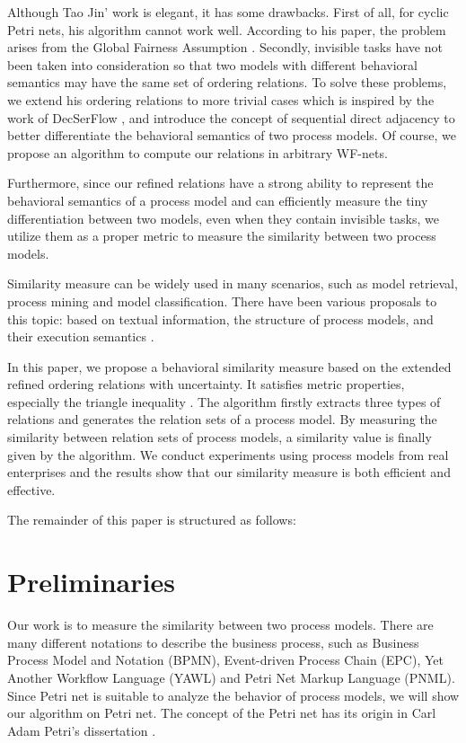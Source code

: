 \documentclass{llncs}
\begin{document}
Although Tao Jin' work is elegant, it has some drawbacks. First of all, for cyclic Petri nets, his algorithm cannot work well. According to his paper, the problem arises from the Global Fairness Assumption \cite{kindler1999liveness}. Secondly, invisible tasks have not been taken into consideration so that two models with different behavioral semantics may have the same set of ordering relations. To solve these problems, we extend his ordering relations to more trivial cases which is inspired by the work of DecSerFlow \cite{van2006decserflow}, and introduce the concept of sequential direct adjacency to better differentiate the behavioral semantics of two process models. Of course, we propose an algorithm to compute our relations in arbitrary WF-nets.

Furthermore, since our refined relations have a strong ability to represent the behavioral semantics of a process model and can efficiently measure the tiny differentiation between two models, even when they contain invisible tasks, we utilize them as a proper metric to measure the similarity between two process models.

Similarity measure can be widely used in many scenarios, such as model retrieval, process mining and model classification. There have been various proposals to this topic: based on textual information, the structure of process models, and their execution semantics \cite{kunze2011behavioral}.

In this paper, we propose a behavioral similarity measure based on the extended refined ordering relations with uncertainty. It satisfies metric properties, especially the triangle inequality \cite{zezula2006similarity}. The algorithm firstly extracts three types of relations and generates the relation sets of a process model. By measuring the similarity between relation sets of process models, a similarity value is finally given by the algorithm. We conduct experiments using process models from real enterprises and the results show that our similarity measure is both efficient and effective.

The remainder of this paper is structured as follows: 

\section{Preliminaries}\label{sec:preliminaries}
Our work is to measure the similarity between two process models. There are many different notations to describe the business process, such as Business Process Model and Notation (BPMN), Event-driven Process Chain (EPC), Yet Another Workflow Language (YAWL) and Petri Net Markup Language (PNML). Since Petri net is suitable to analyze the behavior of process models, we will show our algorithm on Petri net. The concept of the Petri net has its origin in Carl Adam Petri's dissertation \cite{petri1966kommunikation}.
\end{document}
